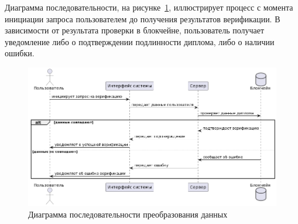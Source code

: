 Диаграмма последовательности, на рисунке~\ref{fig:diploma_verif_uscs}, иллюстрирует процесс с момента инициации запроса пользователем до получения результатов верификации. В зависимости от результата проверки в блокчейне, пользователь получает уведомление либо о подтверждении подлинности диплома, либо о наличии ошибки.

\begin{figure}[H]
	\centering
	\includegraphics[width=.9\textwidth]{images/diploma_verif_uscs.png}
	\parskip=6pt
	\caption{Диаграмма последовательности преобразования данных}
	\label{fig:diploma_verif_uscs}
\end{figure}